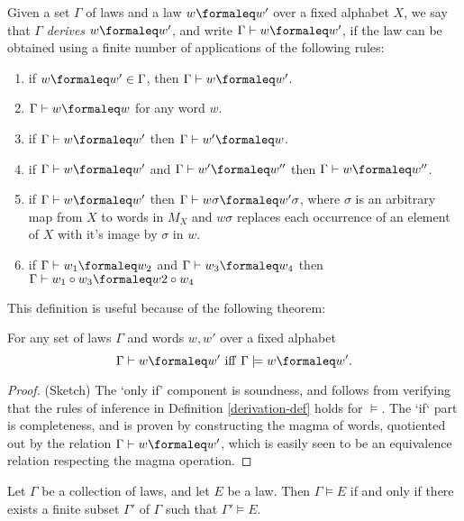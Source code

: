 \begin{definition}[Derivation]\label{derivation-def}
  \leanok
  Given a set $\Gamma$ of laws and a law $w\formaleq w'$ over a fixed alphabet $X$, we say that
  $\Gamma$ \emph{derives} $w\formaleq w'$, and write $\Gamma\vdash w\formaleq w'$, if the law can
  be obtained using a finite number of applications of the following rules:
  \begin{enumerate}
    \item if $w\formaleq w' \in \Gamma$, then $\Gamma\vdash w\formaleq w'$.
    \item $\Gamma\vdash w\formaleq w$ for any word $w$.
    \item if $\Gamma\vdash w\formaleq w'$ then $\Gamma\vdash w'\formaleq w$.
    \item if $\Gamma\vdash w\formaleq w'$ and $\Gamma\vdash w'\formaleq w''$ then $\Gamma\vdash w\formaleq w''$.
    \item if $\Gamma\vdash w\formaleq w'$ then $\Gamma\vdash w\sigma\formaleq w'\sigma$, where $\sigma$ is an arbitrary map from $X$ to words in $M_X$ and $w\sigma$ replaces each occurrence of an element of $X$ with it's image by $\sigma$ in $w$.
    \item if $\Gamma\vdash w_1\formaleq w_2$ and $\Gamma\vdash w_3\formaleq w_4$ then $\Gamma\vdash w_1 \circ w_3\formaleq w2\circ w_4$
  \end{enumerate}
\end{definition}

This definition is useful because of the following theorem:

\begin{theorem}\label{sound-complete}\leanok{}
  For any set of laws $\Gamma$ and words $w, w'$ over a fixed alphabet
  $$ \Gamma\vdash w\formaleq w'\ \mathrm{iff}\ \Gamma\models w\formaleq w'.$$
\end{theorem}
\begin{proof}
  \leanok
  (Sketch) The `only if' component is soundness, and follows from verifying that the rules of inference in Definition \ref{derivation-def} holds for $\models$.  The `if` part is completeness, and is proven by constructing the magma of words, quotiented out by the relation $\Gamma \vdash w \formaleq w'$, which is easily seen to be an equivalence relation respecting the magma operation.
\end{proof}


\begin{corollary}\label{compactness-thm}  Let $\Gamma$ be a collection of laws, and let $E$ be a law.  Then $\Gamma \models E$ if and only if there exists a finite subset $\Gamma'$ of $\Gamma$ such that $\Gamma' \models E$.
\end{corollary}

